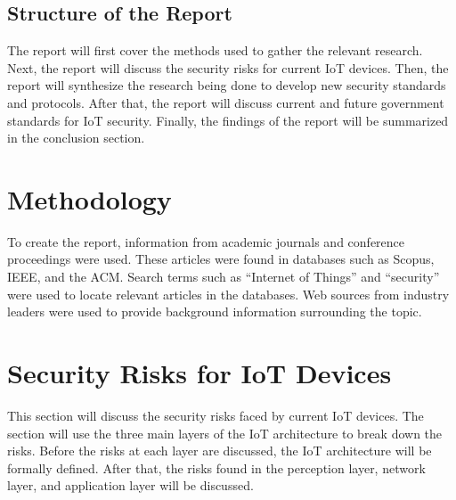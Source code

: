 \documentclass[letterpaper, 12pt]{article}
\begin{document}
\begin{flushleft}
\subsection*{Structure of the Report}
The report will first cover the methods used to gather the relevant research. Next, the report will discuss the security risks for current IoT devices. Then, the report will synthesize the research being
done to develop new security standards and protocols. After that, the report will discuss current and future government standards for IoT security. Finally, the findings of the report will be summarized in the conclusion
section.

\section*{Methodology}

To create the report, information from academic journals and conference proceedings were used. These articles were found in 
databases such as Scopus, IEEE, and the ACM. Search terms such as ``Internet of Things'' and ``security'' were used to locate
relevant articles in the databases. Web sources from industry leaders were used to provide background information surrounding
the topic.\\ 


\section*{Security Risks for IoT Devices}

This section will discuss the security risks faced by current IoT devices. The section will use the three main layers of the IoT architecture to break down the risks. Before the risks at each layer are discussed,
the IoT architecture will be formally defined. After that, the risks found in the perception layer, network layer, and application layer will be discussed.


\end{flushleft}
\end{document}
